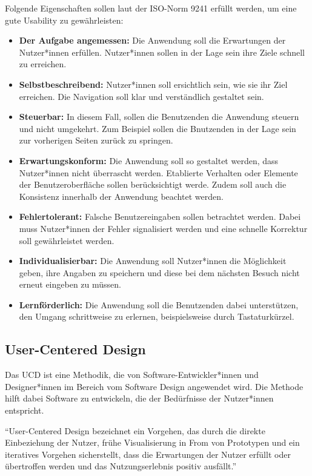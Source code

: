 Folgende Eigenschaften sollen laut der ISO-Norm 9241 \citep{ISO_standard} erfüllt werden, um eine gute Usability zu gewährleisten:

\begin{itemize}
	\item \textbf{Der Aufgabe angemessen:} Die Anwendung soll die Erwartungen der Nutzer*innen erfüllen. Nutzer*innen sollen in der Lage sein ihre Ziele schnell zu erreichen.
	\item \textbf{Selbstbeschreibend:} Nutzer*innen soll ersichtlich sein, wie sie ihr Ziel erreichen. Die Navigation soll klar und verständlich gestaltet sein.
	\item \textbf{Steuerbar:} In diesem Fall, sollen die Benutzenden die Anwendung steuern und nicht umgekehrt. Zum Beispiel sollen die Bnutzenden in der Lage sein zur vorherigen Seiten zurück zu springen.
	\item \textbf{Erwartungskonform:} Die Anwendung soll so gestaltet werden, dass Nutzer*innen nicht überrascht werden. Etablierte Verhalten oder Elemente der Benutzeroberfläche sollen berücksichtigt werde. Zudem soll auch die Konsistenz innerhalb der Anwendung beachtet werden.
	\item \textbf{Fehlertolerant:} Falsche Benutzereingaben sollen betrachtet werden. Dabei muss Nutzer*innen der Fehler signalisiert werden und eine schnelle Korrektur soll gewährleistet werden.
	\item \textbf{Individualisierbar:} Die Anwendung soll Nutzer*innen die Möglichkeit geben, ihre Angaben zu speichern und diese bei dem nächsten Besuch nicht erneut eingeben zu müssen.
	\item \textbf{Lernförderlich:} Die Anwendung soll die Benutzenden dabei unterstützen, den Umgang schrittweise zu erlernen, beispielsweise durch Tastaturkürzel.
\end{itemize}

\subsection{User-Centered Design}

Das \ac{UCD} ist eine Methodik, die von Software-Entwickler*innen und Designer*innen im Bereich vom Software Design angewendet wird. 
Die Methode hilft dabei Software zu entwickeln, die der Bedürfnisse der Nutzer*innen entspricht. \citep[vgl.]{salinas_2020}

\begin{definition}

\enquote{User-Centered Design bezeichnet ein Vorgehen, das durch die direkte Einbeziehung der Nutzer, frühe Visualisierung in From von Prototypen und ein iteratives Vorgehen sicherstellt, dass die Erwartungen der Nutzer erfüllt oder übertroffen werden und das Nutzungserlebnis positiv ausfällt.} \citep{weichert_quick_2021}

\end{definition} 

